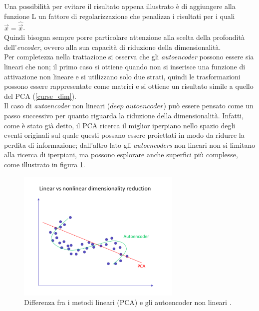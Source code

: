 Una possibilità per evitare il risultato appena illustrato è di aggiungere alla funzione L un fattore di regolarizzazione che penalizza i risultati per i quali $\vec{x} = \hat{\vec{x}}$. \\
Quindi bisogna sempre porre particolare attenzione alla scelta della profondità dell'\textit{encoder}, ovvero alla sua capacità di riduzione della dimensionalità. \\
Per completezza nella trattazione si osserva che gli \textit{autoencoder} possono essere sia lineari che non; il primo caso si ottiene quando non si inserisce una funzione di attivazione non lineare e si utilizzano solo due strati, quindi le trasformazioni possono essere rappresentate come matrici e si ottiene un risultato simile a quello del PCA (\ref{curse_dim}). \\
Il caso di \textit{autoencoder} non lineari ($\textit{deep autoencoder}$) può essere pensato come un passo successivo per quanto riguarda la riduzione della dimensionalità. Infatti, come è stato già detto, il PCA ricerca il miglior iperpiano nello spazio degli eventi originali sul quale questi possano essere proiettati in modo da ridurre la perdita di informazione; dall'altro lato gli \textit{autoencoders} non lineari non si limitano alla ricerca di iperpiani, ma possono esplorare anche superfici più complesse, come illustrato in figura \ref{autoencoder_non_lineari}.

\begin{figure}[h!]
	\centering
	\includegraphics[width=0.70\textwidth]{figs/Autoencoder_non_lineari.png}
	\caption{Differenza fra i metodi lineari (PCA) e gli autoencoder non lineari \cite{Autoencoders}.}
	\label{autoencoder_non_lineari}
\end{figure}


\newpage

